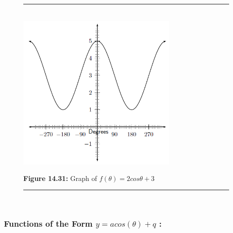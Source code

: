     \setcounter{subfigure}{0}


	\begin{figure}[H] %
    \begin{center}
    \rule[.1in]{\figurerulewidth}{.005in} \\
        \label{m39414*uid52!!!underscore!!!media}\label{m39414*uid52!!!underscore!!!printimage}\includegraphics[width=300px]{col11306.imgs/m39414_trigrep1.png} %
        
      \vspace{2pt}
    \vspace{\rubberspace}\par \begin{cnxcaption}
	  \small \textbf{Figure 14.31: }Graph of \begin{math}f\left(\theta \right)=2cos\theta +3\end{math}
	\end{cnxcaption}
      
    \vspace{.1in}
    \rule[.1in]{\figurerulewidth}{.005in} \\
        
    \end{center}

 \end{figure}   

    \addtocounter{footnote}{-0}
    
\label{m39414*secfhsst!!!underscore!!!id2647}
            \subsubsection{  Functions of the Form $y=acos\left(\theta \right)+q$ :}
            \nopagebreak
            
